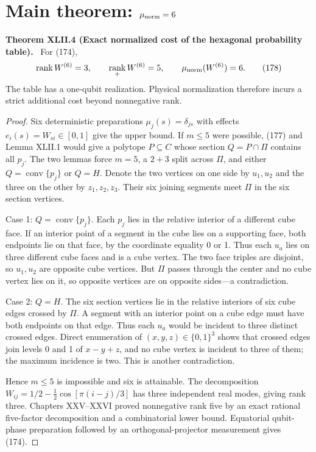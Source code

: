\documentclass[11pt,a4paper,oneside]{book}
\DeclareMathOperator{\rank}{rank}\DeclareMathOperator{\Tr}{Tr}
\newcommand{\statement}[3]{\par\medskip\noindent\textbf{#1 #2 (#3).}\ }
\begin{document}
\section{Main theorem: $\mu_{\rm norm}=6$}
\statement{Theorem}{XLII.4}{Exact normalized cost of the hexagonal probability table}
For (174),
\begin{equation}\rank W^{(6)}=3,\qquad\rank_+W^{(6)}=5,\qquad\mu_{\rm norm}(W^{(6)})=6.\tag{178}\end{equation}
The table has a one-qubit realization. Physical normalization therefore incurs a strict additional cost beyond nonnegative rank.
\begin{proof}
Six deterministic preparations $\mu_j(s)=\delta_{js}$ with effects $e_i(s)=W_{si}\in[0,1]$ give the upper bound. If $m\le5$ were possible, (177) and Lemma XLII.1 would give a polytope $P\subseteq C$ whose section $Q=P\cap\Pi$ contains all $p_j$. The two lemmas force $m=5$, a $2+3$ split across $\Pi$, and either $Q=\operatorname{conv}\{p_j\}$ or $Q=H$. Denote the two vertices on one side by $u_1,u_2$ and the three on the other by $z_1,z_2,z_3$. Their six joining segments meet $\Pi$ in the six section vertices.

Case 1: $Q=\operatorname{conv}\{p_j\}$. Each $p_j$ lies in the relative interior of a different cube face. If an interior point of a segment in the cube lies on a supporting face, both endpoints lie on that face, by the coordinate equality 0 or 1. Thus each $u_a$ lies on three different cube faces and is a cube vertex. The two face triples are disjoint, so $u_1,u_2$ are opposite cube vertices. But $\Pi$ passes through the center and no cube vertex lies on it, so opposite vertices are on opposite sides---a contradiction.

Case 2: $Q=H$. The six section vertices lie in the relative interiors of six cube edges crossed by $\Pi$. A segment with an interior point on a cube edge must have both endpoints on that edge. Thus each $u_a$ would be incident to three distinct crossed edges. Direct enumeration of $(x,y,z)\in\{0,1\}^3$ shows that crossed edges join levels 0 and 1 of $x-y+z$, and no cube vertex is incident to three of them; the maximum incidence is two. This is another contradiction.

Hence $m\le5$ is impossible and six is attainable. The decomposition $W_{ij}=1/2-\tfrac12\cos[\pi(i-j)/3]$ has three independent real modes, giving rank three. Chapters XXV--XXVI proved nonnegative rank five by an exact rational five-factor decomposition and a combinatorial lower bound. Equatorial qubit-phase preparation followed by an orthogonal-projector measurement gives (174).
\end{proof}
\end{document}
